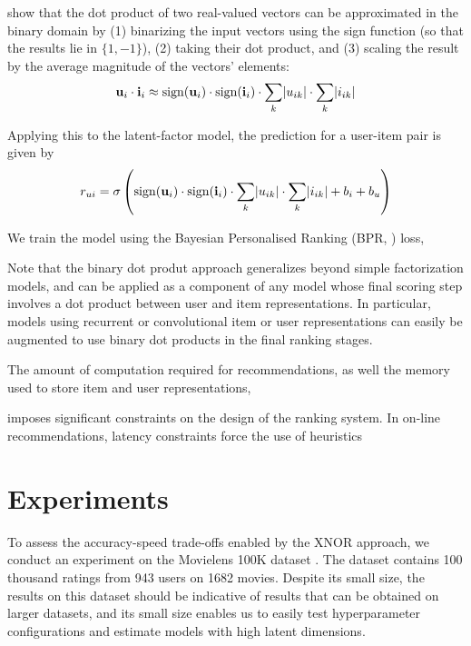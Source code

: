 \documentclass[sigconf]{acmart}
\DeclareMathOperator{\sign}{sign}
\renewcommand\vec{\mathbf}
\begin{document}
\citet{rastegari2016xnor} show that the dot product of two real-valued vectors can be approximated in the binary domain by (1) binarizing the input vectors using the sign function (so that the results lie in $\{1, -1\}$), (2) taking their dot product, and (3) scaling the result by the average magnitude of the vectors' elements:
\begin{equation}
\vec{u}_i \cdot \vec{i}_i \approx \sign(\vec{u}_i) \cdot \sign(\vec{i}_i) \cdot \sum_k\abs{u_{ik}} \cdot \sum_k\abs{i_{ik}}
\end{equation}

Applying this to the latent-factor model, the prediction for a user-item pair is given by
\begin{equation}
r_{ui} = \sigma\left(\sign(\vec{u}_i) \cdot \sign(\vec{i}_i) \cdot \sum_k\abs{u_{ik}} \cdot \sum_k\abs{i_{ik}} + b_i + b_u\right)
\end{equation}


We train the model using the Bayesian Personalised Ranking (BPR, \citet{rendle2009bpr}) loss,


Note that the binary dot produt approach generalizes beyond simple factorization models, and can be applied as a component of any model whose final scoring step involves a dot product between user and item representations. In particular, models using recurrent \citep{hidasi2015session} or convolutional \citep{lynch2015images} item or user representations can easily be augmented to use binary dot products in the final ranking stages.

The amount of computation required for recommendations, as well the memory used to store item and user representations, 

 imposes significant constraints on the design of the ranking system. In on-line recommendations, latency constraints force the use of heuristics 





\section{Experiments}
To assess the accuracy-speed trade-offs enabled by the XNOR approach, we conduct an experiment on the Movielens 100K dataset \citep{harper2016movielens}. The dataset contains 100 thousand ratings from 943 users on 1682 movies. Despite its small size, the results on this dataset should be indicative of results that can be obtained on larger datasets, and its small size enables us to easily test hyperparameter configurations and estimate models with high latent dimensions.
\end{document}
